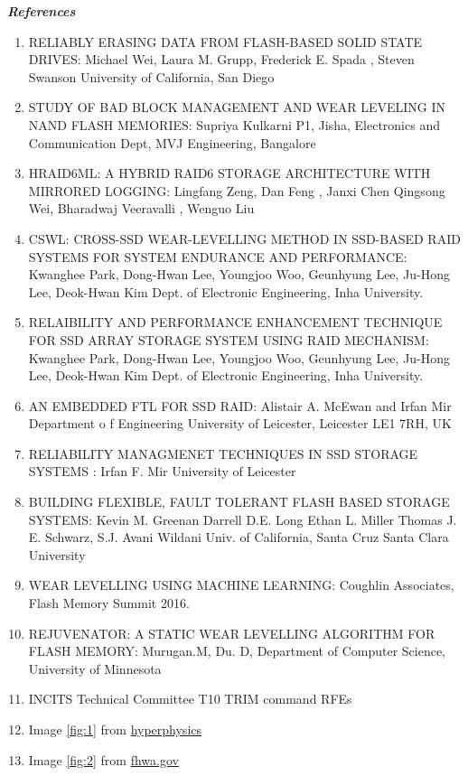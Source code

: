 \textbf{\textit{References}}
\begin{enumerate}

\item  {RELIABLY ERASING DATA FROM FLASH-BASED SOLID STATE DRIVES: Michael Wei, Laura M. Grupp, Frederick E. Spada  , Steven Swanson University of California, San Diego}

\item {STUDY OF BAD BLOCK MANAGEMENT AND WEAR LEVELING IN NAND FLASH MEMORIES: Supriya Kulkarni P1, Jisha, Electronics and Communication Dept, MVJ Engineering, Bangalore}

\item  {HRAID6ML: A HYBRID RAID6 STORAGE ARCHITECTURE WITH MIRRORED LOGGING: Lingfang Zeng, Dan Feng , Janxi Chen  Qingsong Wei, Bharadwaj Veeravalli , Wenguo Liu}

\item  CSWL: CROSS-SSD WEAR-LEVELLING METHOD IN SSD-BASED RAID SYSTEMS FOR SYSTEM ENDURANCE AND  PERFORMANCE: Kwanghee Park, Dong-Hwan Lee, Youngjoo Woo, Geunhyung Lee, Ju-Hong Lee, Deok-Hwan Kim Dept. of Electronic Engineering, Inha University.

\item  RELAIBILITY AND PERFORMANCE ENHANCEMENT TECHNIQUE FOR SSD ARRAY STORAGE SYSTEM USING RAID MECHANISM: Kwanghee Park, Dong-Hwan Lee, Youngjoo Woo, Geunhyung Lee, Ju-Hong Lee, Deok-Hwan Kim Dept. of Electronic Engineering, Inha University.

\item  AN EMBEDDED FTL FOR SSD RAID: Alistair A. McEwan and Irfan Mir Department o f Engineering University of Leicester, Leicester LE1 7RH, UK

\item  RELIABILITY MANAGMENET TECHNIQUES IN SSD STORAGE SYSTEMS : Irfan F. Mir University of Leicester 

\item BUILDING FLEXIBLE, FAULT TOLERANT FLASH BASED STORAGE SYSTEMS: Kevin M. Greenan Darrell D.E. Long Ethan L. Miller  Thomas J. E. Schwarz, S.J.  Avani Wildani  Univ. of California, Santa Cruz  Santa Clara University 

\item WEAR LEVELLING USING MACHINE LEARNING: Coughlin Associates, Flash Memory Summit 2016.

\item REJUVENATOR: A STATIC WEAR LEVELLING ALGORITHM FOR FLASH MEMORY: Murugan.M, Du. D, Department of Computer Science, University of Minnesota

\item INCITS Technical Committee T10 TRIM command RFEs

\item Image \ref{fig:1} from \href{http://hyperphysics.phy-astr.gsu.edu/hbase/quantum/barr.html}{hyperphysics} 

\item Image \ref{fig:2} from \href {https://www.fhwa.dot.gov/publications/research/infrastructure/pavements/12072/002.cfm}{fhwa.gov}  

\end{enumerate}
